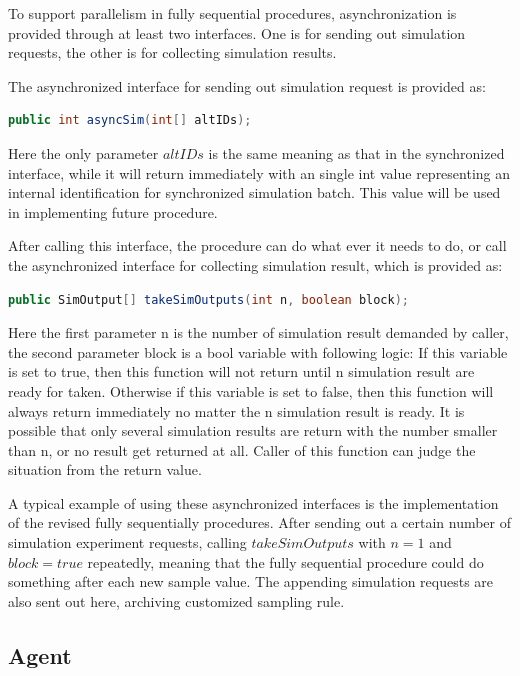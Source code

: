 To support parallelism in fully sequential procedures, asynchronization is provided through at least two interfaces. One is for sending out simulation requests, the other is for collecting simulation results.

The asynchronized interface for sending out simulation request is provided as:

\begin{lstlisting}[language=Java]
public int asyncSim(int[] altIDs);
\end{lstlisting}

Here the only parameter $altIDs$ is the same meaning as that in the synchronized interface, while it will return immediately with an single int value representing an internal identification for synchronized simulation batch. This value will be used in implementing future procedure.

After calling this interface, the procedure can do what ever it needs to do, or call the asynchronized interface for collecting simulation result, which is provided as:

\begin{lstlisting}[language=Java]
public SimOutput[] takeSimOutputs(int n, boolean block);
\end{lstlisting}

Here the first parameter n is the number of simulation result demanded by caller, the second parameter block is a bool variable with following logic: If this variable is set to true, then this function will not return until n simulation result are ready for taken. Otherwise if this variable  is set to false, then this function will always return immediately no matter the n simulation result is ready. It is possible that only several simulation results are return with the number smaller than n, or no result get returned at all. Caller of this function can judge the situation from the return value.

A typical example of using these asynchronized interfaces is the implementation of the revised fully sequentially procedures. After sending out a certain number of simulation experiment requests, calling $takeSimOutputs$ with $n = 1$ and $block = true$ repeatedly, meaning that the fully sequential procedure could do something after each new sample value. The appending simulation requests are also sent out here, archiving customized sampling rule.

\subsection{Agent}

